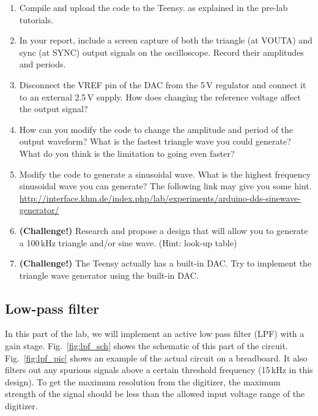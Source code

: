 \documentclass[letterpaper, 11pt]{article}
\begin{document}
\begin{enumerate}
\item Compile and upload the code to the Teensy.  as explained in the pre-lab tutorials.

\item In your report, include a screen capture of both the triangle (at VOUTA) and sync (at SYNC) output signals on the oscilloscope. Record their amplitudes and periods.

\item Disconnect the VREF pin of the DAC from the 5\,V regulator and connect it to an external 2.5\,V supply. How does changing the reference voltage affect the output signal?

\item How can you modify the code to change the amplitude and period of the output waveform? What is the fastest triangle wave you could generate? What do you think is the limitation to going even faster?

\item Modify the code to generate a sinusoidal wave. What is the highest frequency sinusoidal wave you can generate? The following link may give you some hint. 
\url{http://interface.khm.de/index.php/lab/experiments/arduino-dds-sinewave-generator/} 

\item \textbf{(Challenge!)} Research and propose a design that will allow you to generate a 100\,kHz triangle and/or sine wave. (Hint: look-up table)

\item \textbf{(Challenge!)} The Teensy actually has a built-in DAC. Try to implement the triangle wave generator using the built-in DAC. 

\end{enumerate}

\subsection{Low-pass filter}

In this part of the lab, we will implement an active low pass filter (LPF) with a gain stage. Fig.~\ref{fig:lpf_sch} shows the schematic of this part of the circuit. Fig.~\ref{fig:lpf_pic} shows an example of the actual circuit on a breadboard. It also filters out any spurious signals above a certain threshold frequency (15\,kHz in this design). To get the maximum resolution from the digitizer, the maximum strength of the signal should be less than the allowed input voltage range of the digitizer. 
\end{document}
